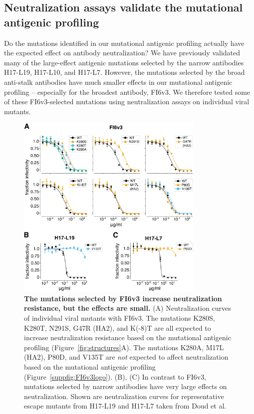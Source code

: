 \documentclass[11pt]{article}
\begin{document}
\subsection*{Neutralization assays validate the mutational antigenic profiling}
Do the mutations identified in our mutational antigenic profiling actually have the expected effect on antibody neutralization?
We have previously validated many of the large-effect antigenic mutations selected by the narrow antibodies H17-L19, H17-L10, and H17-L7\cite{doud2017complete}.
However, the mutations selected by the broad anti-stalk antibodies have much smaller effects in our mutational antigenic profiling -- especially for the broadest antibody, FI6v3.
We therefore tested some of these FI6v3-selected mutations using neutralization assays on individual viral mutants.

\begin{figure}
\centerline{\includegraphics[width=0.8\textwidth]{figs/FI6v3mutant_neutcurves/FI6v3_mutant_neutcurves.pdf}}
\caption{
\label{fig:FI6v3neutcurves}
{\bf The mutations selected by FI6v3 increase neutralization resistance, but the effects are small.}
(A) Neutralization curves of individual viral mutants with FI6v3.
The mutations K280S, K280T, N291S, G47R (HA2), and K(-8)T are all expected to increase neutralization resistance based on the mutational antigenic profiling (Figure~\ref{fig:structures}A). 
The mutations K280A, M17L (HA2), P80D, and V135T are \emph{not} expected to affect neutralization based on the mutational antigenic profiling (Figure~\ref{suppfig:FI6v3logo}).
(B), (C) In contrast to FI6v3, mutations selected by narrow antibodies have very large effects on neutralization.
Shown are neutralization curves for representative escape mutants from H17-L19 and H17-L7 taken from Doud et al\cite{doud2017complete}.
}
\end{figure}
\end{document}
